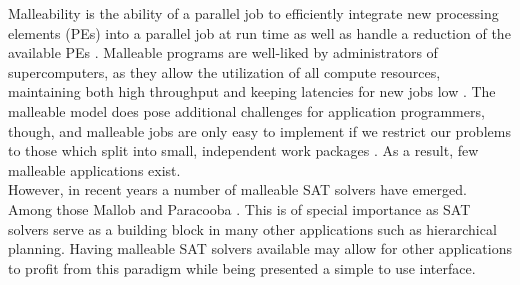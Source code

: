 \documentclass[enabledeprecatedfontcommands,12pt,a4paper,twoside]{scrartcl}
\numberwithin{equation}{section}
\begin{document}
\begin{comment}
- hierarchical planning is popular
- domain-independent automated planning
- decompose a set of initial tasks until they have been decomposed to the level of simple actions
- these actions form a plan which achieve the initial tasks
- TOHTN planning is a sub-problem of HTN planning where all tasks are constrained by a total order

- hierarchical planners are easy to use
- hierarchy allows the user to insert structure into the problem and advise the planner
- hierarchical planning is used in a number of domains
- \cite{munoz2004role} real-time strategy games\\
- \cite{ontanon2015adversarial} improve minimax game tree search in RTS, reduce branching factor
- \cite{lin2020htn} also takes the opponent's strategy into account

- \cite{sirin2004htn} web service composition
- \cite{georgievski2017cloud} cloud application composition

- \cite{gonzalez2017three} socially assistive robotics
- \cite{padia2018yarn} storyline visualizations
- \cite{mohr2018ml} automated machine learning

- hierarchical planning is expensive \cite{erol1994htn}
- HTN is semi-decidable, TOHTN is in D-EXPTIME, EXPSPACE-hard \cite{erol1996complexity}
- there is a correspondence between TOHTN and context free languages \cite{holler2014language}
- hierarchical problems can be recursive which makes the detection of duplicate states important
\end{comment}

Malleability is the ability of a parallel job to efficiently integrate new processing elements (PEs) into a parallel job at run time as well as handle a reduction of the available PEs \cite{feitelson1997job}. Malleable programs are well-liked by administrators of supercomputers, as they allow the utilization of all compute resources, maintaining both high throughput and keeping latencies for new jobs low \cite{feitelson1997job, hungershofer2004combined}. The malleable model does pose additional challenges for application programmers, though, and malleable jobs are only easy to implement if we restrict our problems to those which split into small, independent work packages \cite{feitelson1997job, tucker1989process}. As a result, few malleable applications exist. \\
However, in recent years a number of malleable SAT solvers have emerged. Among those Mallob \cite{sanders2022decentralized} and Paracooba \cite{heisinger2020distributed}. This is of special importance as SAT solvers serve as a building block in many other applications such as hierarchical planning. Having malleable SAT solvers available may allow for other applications to profit from this paradigm while being presented a simple to use interface. \\
\end{document}
